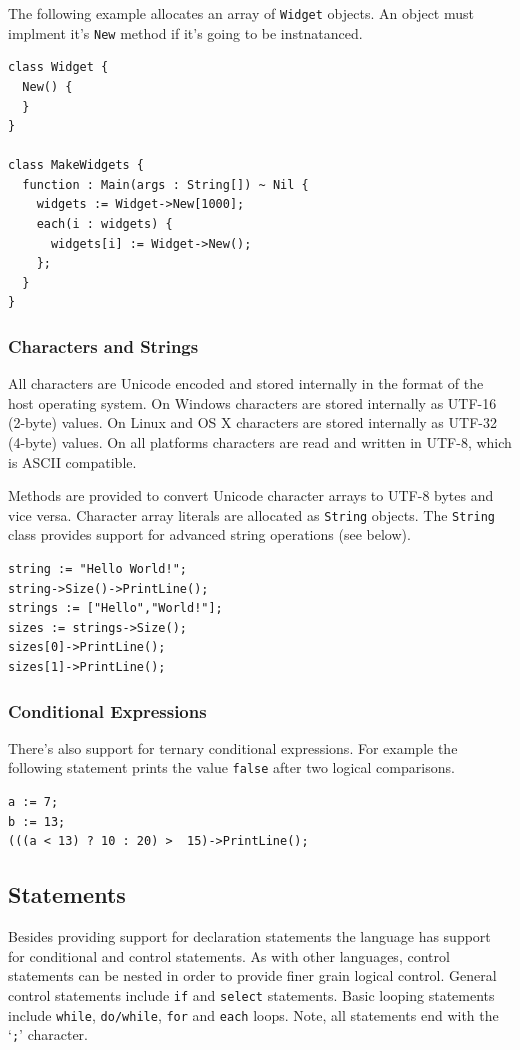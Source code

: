 \documentclass[11pt]{article}
\begin{document}
The following example allocates an array of \texttt{Widget} objects.
An object must implment it's \texttt{New} method if it's going to be
instnatanced.

\begin{verbatim}
class Widget {
  New() {
  }
}

class MakeWidgets {
  function : Main(args : String[]) ~ Nil {
    widgets := Widget->New[1000];
    each(i : widgets) {
      widgets[i] := Widget->New();
    };
  }
}
\end{verbatim}

\subsubsection{Characters and Strings}
All characters are Unicode encoded and stored internally in the format of the host operating system.  On Windows characters are stored internally as UTF-16 (2-byte) values.  On Linux and OS X characters are stored internally as UTF-32 (4-byte) values.  On all platforms characters are read and written in UTF-8, which is ASCII compatible.  

Methods are provided to convert Unicode character arrays to UTF-8 bytes and vice versa.  Character array literals are allocated as \texttt{String} objects.  The \texttt{String} class provides support for advanced string operations (see below).

\begin{verbatim}
string := "Hello World!";
string->Size()->PrintLine();
strings := ["Hello","World!"];
sizes := strings->Size();
sizes[0]->PrintLine();
sizes[1]->PrintLine();
\end{verbatim}

\subsubsection{Conditional Expressions}
There's also support for ternary conditional expressions.  For example
the following statement prints the value \texttt{false} after two
logical comparisons.

\begin{verbatim}
a := 7;
b := 13;
(((a < 13) ? 10 : 20) >  15)->PrintLine();
\end{verbatim}

\subsection{Statements}
Besides providing support for declaration statements the language has
support for conditional and control statements.  As with other
languages, control statements can be nested in order to provide finer
grain logical control. General control statements include \texttt{if}
and \texttt{select} statements. Basic looping statements include
\texttt{while}, \texttt{do/while}, \texttt{for} and \texttt{each}
loops.  Note, all statements end with the `\texttt{;}' character.
\end{document}
